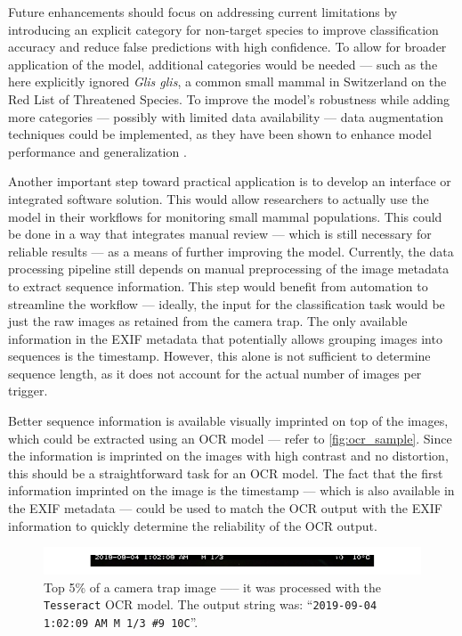 Future enhancements should focus on addressing current limitations by introducing an explicit category for non-target species to improve classification accuracy and reduce false predictions with high confidence.
To allow for broader application of the model, additional categories would be needed --- such as the here explicitly ignored \textit{Glis glis}, a common small mammal in Switzerland on the \textcite{iucnIUCNRedList2025} Red List of Threatened Species.
To improve the model's robustness while adding more categories --- possibly with limited data availability --- data augmentation techniques could be implemented, as they have been shown to enhance model performance and generalization \autocite{shortenSurveyImageData2019}.

Another important step toward practical application is to develop an interface or integrated software solution.
This would allow researchers to actually use the model in their workflows for monitoring small mammal populations.
This could be done in a way that integrates manual review --- which is still necessary for reliable results --- as a means of further improving the model.
Currently, the data processing pipeline still depends on manual preprocessing of the image metadata to extract sequence information.
This step would benefit from automation to streamline the workflow --- ideally, the input for the classification task would be just the raw images as retained from the camera trap.
The only available information in the \ac{EXIF} metadata that potentially allows grouping images into sequences is the timestamp.
However, this alone is not sufficient to determine sequence length, as it does not account for the actual number of images per trigger.

Better sequence information is available visually imprinted on top of the images, which could be extracted using an \ac{OCR} model --- refer to \autoref{fig:ocr_sample}.
Since the information is imprinted on the images with high contrast and no distortion, this should be a straightforward task for an \ac{OCR} model.
The fact that the first information imprinted on the image is the timestamp — which is also available in the \ac{EXIF} metadata --- could be used to match the \ac{OCR} output with the \ac{EXIF} information to quickly determine the reliability of the \ac{OCR} output.

\begin{figure}[ht]
\centering
\includegraphics{figures/ocr_example.pdf}
\caption{Top 5\% of a camera trap image —-- it was processed with the \texttt{Tesseract} \ac{OCR} model. The output string was: \enquote{\texttt{2019-09-04 1:02:09 AM M 1/3 \#9 10\textdegree C}}.}
\label{fig:ocr_sample}
\end{figure}
